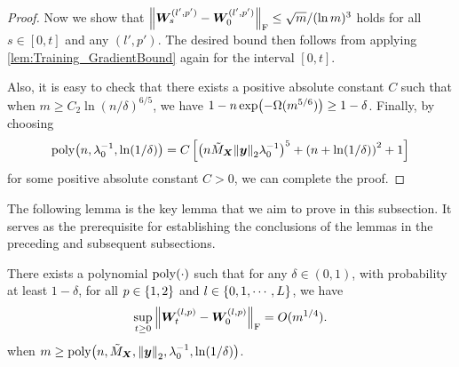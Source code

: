 \begin{proof}
  Now we show that $\norm{\bm{W}^{(l',p')}_s- \bm{W}^{(l',p')}_0}_{\mathrm{F}} \leq {\sqrt{m}}/{(\ln m)^3}$ holds for all $s \in [0,t]$ and any $(l',p')$.
  The desired bound then follows from applying \cref{lem:Training_GradientBound} again for the interval $[0,t]$.

  Also, it is easy to check that there exists a positive absolute constant $C$ such that when $m
  \geq C_2\ln(n/\delta)^{6/5}$, we have $1-n\exp\xkm{-\Omega(m^{5/6})}\geq 1-\delta$.
  Finally, by choosing
  \[\poly\xkm{n,\lambda_0^{-1},\ln(1/\delta)}=C\zk{\xk{n\tilde{M}_{\bm{X}}\norm{\bm{y}}_2\lambda_0^{-1}}^{5}+\xk{n+\ln(1/\delta)}^2+1}\]
  for some positive absolute constant $C>0$, we can complete the proof.
\end{proof}


The following lemma is the key lemma that we aim to prove in this subsection.
It serves as the prerequisite for establishing the conclusions of the lemmas in the preceding and subsequent subsections.

\begin{lemma}
  \label{lem:A_lazy_regime}
  There exists a polynomial $\mathrm{poly}(\cdot)$ such that for any $\delta\in(0,1)$, with probability at least $1-\delta$, for all $p\in\left\{1,2\right\}$ and $l\in\left\{0,1,\cdots,L\right\}$, we have
  \begin{align*}
    \sup_{t \geq 0}\norm{\bm{W}^{(l,p)}_t - \bm{W}^{(l,p)}_0 }_{\mathrm{F}} =O(m^{1/4}).
  \end{align*}
  when $m\geq\poly\xkm{n,\tilde{M}_{\bm{X}},\norm{\bm{y}}_2,\lambda_0^{-1},\ln(1/\delta)}$.
\end{lemma}

